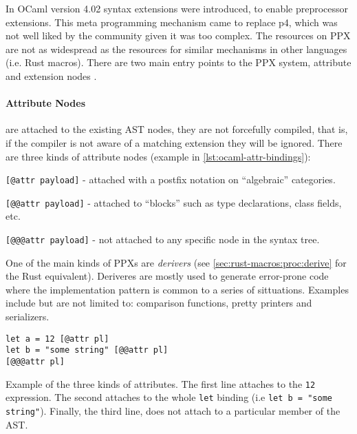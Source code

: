 In OCaml version 4.02 syntax extensions were introduced, to enable preprocessor extensions.
This meta programming mechanism came to replace \gls{p4}, which was not well liked by the community given it was too complex.
The resources on \gls{PPX} are not as widespread as the resources for similar mechanisms in other languages (i.e. Rust macros).
There are two main entry points to the PPX system, attribute and extension nodes \autocite[Sections 8.12 \& 8.13]{Leroy2020}.

\paragraph{Attribute Nodes} are attached to the existing AST nodes,
they are not forcefully compiled, that is, if the compiler is not aware of a matching extension they will be ignored.
There are three kinds of attribute nodes (example in \autoref{lst:ocaml-attr-bindings}):
\begin{displayquote}
	\begin{compactitem}
		\item \texttt{[@attr payload]} - attached with a postfix notation on “algebraic” categories.
		\item \texttt{[@@attr payload]} - attached to “blocks” such as type declarations, class fields, etc.
		\item \texttt{[@@@attr payload]} - not attached to any specific node in the syntax tree.
	\end{compactitem}
\end{displayquote}

One of the main kinds of PPXs are \emph{derivers} (see \autoref{sec:rust-macros:proc:derive} for the Rust equivalent).
Deriveres are mostly used to generate error-prone code where the implementation pattern is common to a series of sittuations.
Examples include but are not limited to: comparison functions, pretty printers and serializers.

% 
\begin{listing}
	\begin{verbatim}
let a = 12 [@attr pl]
let b = "some string" [@@attr pl]
[@@@attr pl]
    \end{verbatim}
	\caption[Example of the three kinds of attributes.]{
		Example of the three kinds of attributes\footnotemark.
		The first line attaches to the \texttt{12} expression.
		The second attaches to the whole \texttt{let} binding (i.e \texttt{let b = "some string"}).
		Finally, the third line, does not attach to a particular member of the AST.
	}
	\label{lst:ocaml-attr-bindings}
\end{listing}


